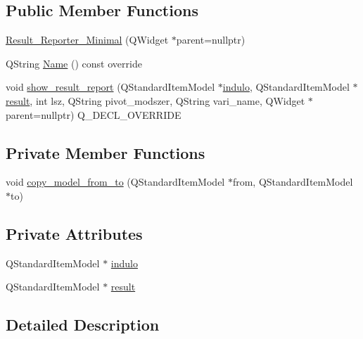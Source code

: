 \subsection*{Public Member Functions}
\begin{DoxyCompactItemize}
\item 
\hyperlink{classResult__Reporter__Minimal_ac8df5caefa98c8a146bb5cf667febb73}{Result\+\_\+\+Reporter\+\_\+\+Minimal} (Q\+Widget $\ast$parent=nullptr)
\item 
Q\+String \hyperlink{classResult__Reporter__Minimal_ae6bd38556e2b7b724ab077574665aae5}{Name} () const override
\item 
void \hyperlink{classResult__Reporter__Minimal_af40ff386283122012cf55bf9c415fa71}{show\+\_\+result\+\_\+report} (Q\+Standard\+Item\+Model $\ast$\hyperlink{classResult__Reporter__Minimal_a30391e0ed51c95c0904a4f11810d3a8b}{indulo}, Q\+Standard\+Item\+Model $\ast$\hyperlink{classResult__Reporter__Minimal_aed1a497f319d5bf551f37d576a197da7}{result}, int lsz, Q\+String pivot\+\_\+modszer, Q\+String vari\+\_\+name, Q\+Widget $\ast$parent=nullptr) Q\+\_\+\+D\+E\+C\+L\+\_\+\+O\+V\+E\+R\+R\+I\+DE
\end{DoxyCompactItemize}
\subsection*{Private Member Functions}
\begin{DoxyCompactItemize}
\item 
void \hyperlink{classResult__Reporter__Minimal_a78e7fa3f0888cac081fb3e362fe9bb87}{copy\+\_\+model\+\_\+from\+\_\+to} (Q\+Standard\+Item\+Model $\ast$from, Q\+Standard\+Item\+Model $\ast$to)
\end{DoxyCompactItemize}
\subsection*{Private Attributes}
\begin{DoxyCompactItemize}
\item 
Q\+Standard\+Item\+Model $\ast$ \hyperlink{classResult__Reporter__Minimal_a30391e0ed51c95c0904a4f11810d3a8b}{indulo}
\item 
Q\+Standard\+Item\+Model $\ast$ \hyperlink{classResult__Reporter__Minimal_aed1a497f319d5bf551f37d576a197da7}{result}
\end{DoxyCompactItemize}


\subsection{Detailed Description}


